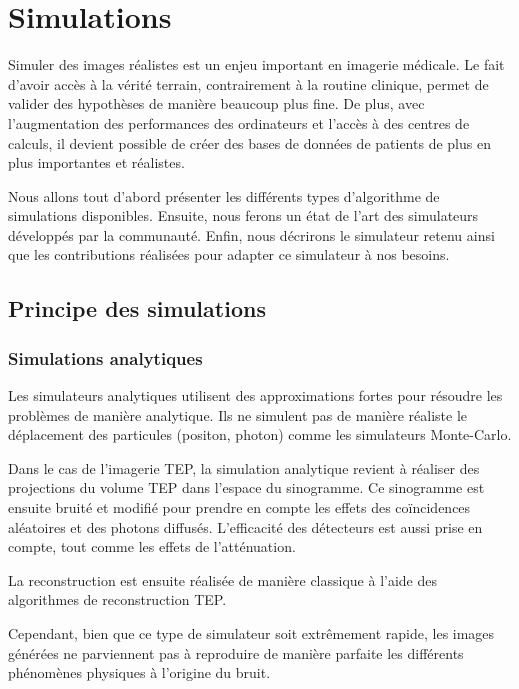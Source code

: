 \chapter{Simulations}

Simuler des images réalistes est un enjeu important en imagerie médicale. Le fait d'avoir accès à la vérité terrain, contrairement à la routine clinique, permet de valider des hypothèses de manière beaucoup plus fine. De plus, avec l'augmentation des performances des ordinateurs et l'accès à des centres de calculs, il devient possible de créer des bases de données de patients de plus en plus importantes et réalistes.

Nous allons tout d'abord présenter les différents types d'algorithme de simulations disponibles. Ensuite, nous ferons un état de l'art des simulateurs développés par la communauté. Enfin, nous décrirons le simulateur retenu ainsi que les contributions réalisées pour adapter ce simulateur à nos besoins.

	\section{Principe des simulations}

		\subsection{Simulations analytiques}

Les simulateurs analytiques utilisent des approximations fortes pour résoudre les problèmes de manière analytique. Ils ne simulent pas de manière réaliste le déplacement des particules (positon, photon) comme les simulateurs Monte-Carlo.

Dans le cas de l'imagerie TEP, la simulation analytique revient à réaliser des projections du volume TEP dans l'espace du sinogramme. Ce sinogramme est ensuite bruité et modifié pour prendre en compte les effets des coïncidences aléatoires et des photons diffusés. L'efficacité des détecteurs est aussi prise en compte, tout comme les effets de l'atténuation. 

La reconstruction est ensuite réalisée de manière classique à l'aide des algorithmes de reconstruction TEP.


Cependant, bien que ce type de simulateur soit extrêmement rapide, les images générées ne parviennent pas à reproduire de manière parfaite les différents phénomènes physiques à l'origine du bruit.




